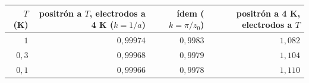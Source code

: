 \begin{tabular}{rrrr}
\toprule
$T$ (K) & positrón a $T$, electrodos a 4 K ($k=1/a$) & ídem ($k=\pi/z_0$) & positrón a 4 K, electrodos a $T$ \\
\midrule
$1$ & $0{,}99974$ & $0{,}9983$ & $1{,}082$ \\
$0{,}3$ & $0{,}99968$ & $0{,}9979$ & $1{,}104$ \\
$0{,}1$ & $0{,}99966$ & $0{,}9978$ & $1{,}110$ \\
\bottomrule
\end{tabular}
